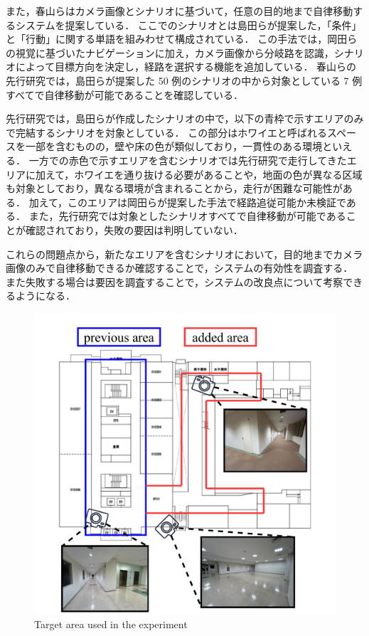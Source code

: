 また，春山らはカメラ画像とシナリオに基づいて，任意の目的地まで自律移動するシステムを提案している．
ここでのシナリオとは島田らが提案した，「条件」と「行動」に関する単語を組みわせて構成されている．
この手法では，岡田らの視覚に基づいたナビゲーションに加え，カメラ画像から分岐路を認識，シナリオによって目標方向を決定し，経路を選択する機能を追加している．
春山らの先行研究では，島田らが提案した 50 例のシナリオの中から対象としている 7 例すべてで自律移動が可能であることを確認している．

先行研究では，島田らが作成したシナリオの中で，以下の青枠で示すエリアのみで完結するシナリオを対象としている．
この部分はホワイエと呼ばれるスペースを一部を含むものの，壁や床の色が類似しており，一貫性のある環境といえる．
一方での赤色で示すエリアを含むシナリオでは先行研究で走行してきたエリアに加えて，ホワイエを通り抜ける必要があることや，地面の色が異なる区域も対象としており，異なる環境が含まれることから，走行が困難な可能性がある．
加えて，このエリアは岡田らが提案した手法で経路追従可能か未検証である．
また，先行研究では対象としたシナリオすべてで自律移動が可能であることが確認されており，失敗の要因は判明していない．

これらの問題点から，新たなエリアを含むシナリオにおいて，目的地までカメラ画像のみで自律移動できるか確認することで，システムの有効性を調査する．
また失敗する場合は要因を調査することで，システムの改良点について考察できるようになる．

\begin{figure}[htbp]
     \centering
     \includegraphics[width=130mm]{images/pdf/ishiguro/cit3f.pdf}
     \caption{Target area used in the experiment}
     \label{fig:cit3f}
\end{figure}

\newpage
